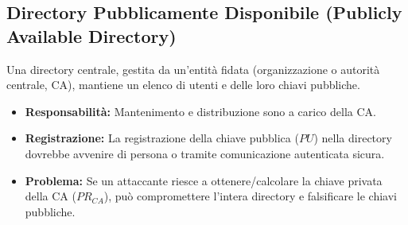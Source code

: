 \documentclass{article}
\begin{document}
\subsection{Directory Pubblicamente Disponibile (Publicly Available Directory)}
Una directory centrale, gestita da un'entità fidata (organizzazione o autorità centrale, CA), mantiene un elenco di utenti e delle loro chiavi pubbliche.
\begin{itemize}
    \item \textbf{Responsabilità:} Mantenimento e distribuzione sono a carico della CA.
    \item \textbf{Registrazione:} La registrazione della chiave pubblica ($PU$) nella directory dovrebbe avvenire di persona o tramite comunicazione autenticata sicura.
    \item \textbf{Problema:} Se un attaccante riesce a ottenere/calcolare la chiave privata della CA ($PR_{CA}$), può compromettere l'intera directory e falsificare le chiavi pubbliche.
\end{itemize}
\end{document}
